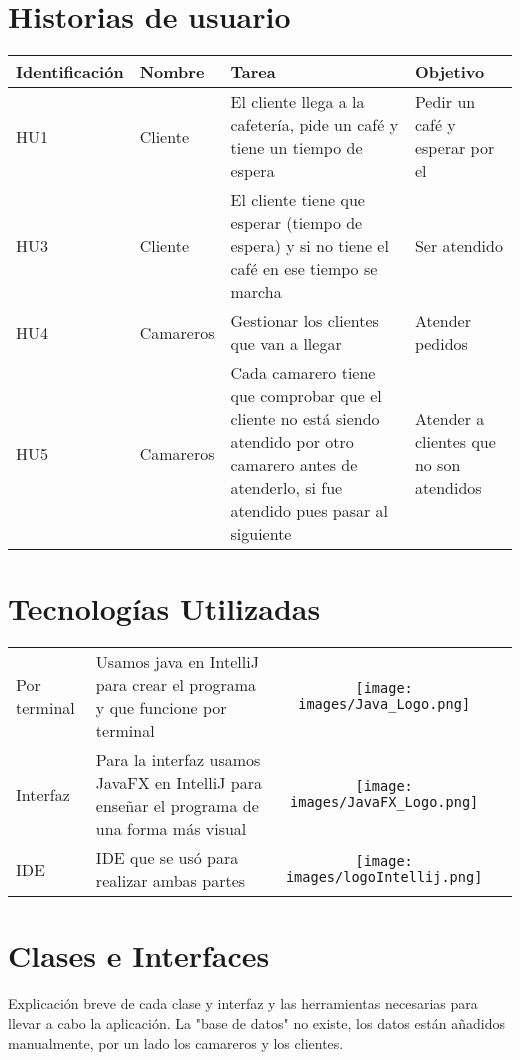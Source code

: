 \documentclass[a4paper,12pt]{article}
\begin{document}
\section{Historias de usuario}
\begin{tabular}{|l|p{2cm}|p{5cm}|p{5cm}|}
    \hline
    Identificación & Nombre & Tarea & Objetivo\\ \hline
    HU1 & Cliente & El cliente llega a la cafetería, pide un café y tiene un tiempo de espera & Pedir un café y esperar por el \\ \hline
    HU3 & Cliente & El cliente tiene que esperar (tiempo de espera) y si no tiene el café en ese tiempo se marcha  & Ser atendido \\ \hline
    HU4 & Camareros & Gestionar los clientes que van a llegar & Atender pedidos\\ \hline
    HU5 & Camareros & Cada camarero tiene que comprobar que el cliente no está siendo atendido por otro camarero antes de atenderlo, si fue atendido pues pasar al siguiente & Atender a clientes que no son atendidos \\ \hline
   
\end{tabular}

\vspace{1cm}

\section{Tecnologías Utilizadas}

\begin{tabular}{l|p{8cm}|cm{2cm}}
    Por terminal & Usamos java en IntelliJ para crear el programa y que funcione por terminal & \texttt{[image: images/Java\_Logo.png]} \\
    Interfaz & Para la interfaz usamos JavaFX en IntelliJ para enseñar el programa de una forma más visual & \texttt{[image: images/JavaFX\_Logo.png]}\\
    IDE & IDE que se usó para realizar ambas partes & \texttt{[image: images/logoIntellij.png]}\\

\end{tabular}

\vspace{3cm}
\section{Clases e Interfaces}
Explicación breve de cada clase y interfaz y las herramientas necesarias para llevar a cabo la aplicación. La "base de datos" no existe, los datos están añadidos manualmente, por un lado los camareros y los clientes.
\end{document}

